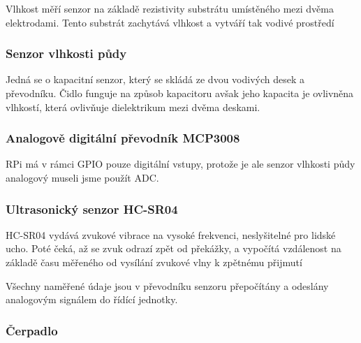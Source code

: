 \documentclass[12pt,a4paper]{article}
\begin{document}
Vlhkost měří senzor na základě rezistivity substrátu umístěného mezi dvěma elektrodami. Tento substrát zachytává vlhkost a vytváří tak vodivé prostředí

\subsubsection{Senzor vlhkosti půdy}

Jedná se o kapacitní senzor, který se skládá ze dvou vodivých desek a převodníku. Čidlo funguje na způsob kapacitoru avšak jeho kapacita je ovlivněna vlhkostí, která ovlivňuje dielektrikum mezi dvěma deskami.

\subsubsection{Analogově digitální převodník MCP3008}

\ac{RPi} má v rámci \ac{GPIO} pouze digitální vstupy, protože je ale senzor vlhkosti půdy analogový museli jsme použít \ac{ADC}.



\subsubsection{Ultrasonický senzor HC-SR04}

\ac{HC-SR04} vydává zvukové vibrace na vysoké frekvenci, neslyšitelné pro lidské ucho. Poté čeká, až se zvuk odrazí zpět od překážky, a vypočítá vzdálenost na základě času měřeného od vysílání zvukové vlny k zpětnému přijmutí

Všechny naměřené údaje jsou v převodníku senzoru přepočítány a odeslány analogovým signálem do řídící jednotky.

\subsubsection{Čerpadlo}
\end{document}
